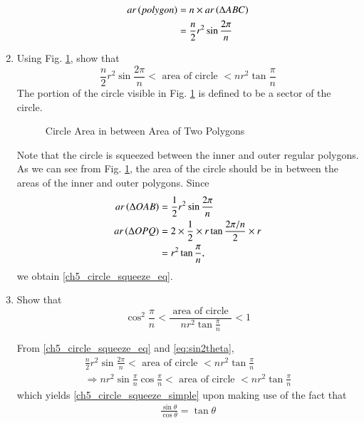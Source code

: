 \begin{enumerate}[label=\arabic*.,ref=\thesubsection.\theenumi]
%
\begin{equation}
\begin{split}
ar\left(polygon\right) &= n \times ar\left(\Delta ABC\right) \\
&= \frac{n}{2}r^{2}\sin\frac{2\pi}{n}
\end{split}
\end{equation}
%
\item
	Using Fig. \ref{ch5_circle_squeeze}, show that
%
\begin{equation}
\label{ch5_circle_squeeze_eq}
\frac{n}{2}r^{2}\sin\frac{2\pi}{n} < \text{ area of circle } < nr^{2}\tan\frac{\pi}{n}
\end{equation}
%
The portion of the circle visible in Fig. \ref{ch5_circle_squeeze} is defined to be a sector of the circle.

\begin{figure}[!ht]
	\begin{center}
		
		\resizebox{\columnwidth}{!}{}
	\end{center}
	\caption{Circle Area in between Area of Two Polygons}
	\label{ch5_circle_squeeze}	
\end{figure}
%

\solution Note that the circle is squeezed between the inner and outer regular polygons.  As we can see from Fig. \ref{ch5_circle_squeeze}, the area of the circle should be in between the areas of the inner and outer polygons.  Since
%
\begin{align}
ar \left(\Delta OAB\right) &= \frac{1}{2}r^{2}\sin\frac{2\pi}{n} \\
ar \left(\Delta OPQ\right) &= 2 \times \frac{1}{2} \times r \tan\frac{2\pi/n}{2} \times r \\
&= r^{2}\tan\frac{\pi}{n},
\end{align}
%
we obtain \eqref{ch5_circle_squeeze_eq}.
%
\item
Show that
	\begin{equation}
	\label{ch5_circle_squeeze_simple}
\cos^2\frac{\pi}{n} < \frac{\text{ area of circle }}{nr^{2}\tan\frac{\pi}{n}} < 1	\end{equation}

\solution From \eqref{ch5_circle_squeeze_eq} and \eqref{eq:sin2theta},
{\small
	\begin{align}
	\frac{n}{2}r^{2}\sin\frac{2\pi}{n} < \text{ area of circle } 
	< nr^{2}\tan\frac{\pi}{n} 
	\\
\Rightarrow 	
	{n}r^{2}\sin\frac{\pi}{n}\cos\frac{\pi}{n} < \text{ area of circle } 
	< nr^{2}\tan\frac{\pi}{n} 
	\end{align}
%
}
which yields 	\eqref{ch5_circle_squeeze_simple} upon making use of the fact that 
%
\begin{align}
\frac{\sin \theta}{\cos \theta} = \tan \theta
\end{align}
%


\end{enumerate}
